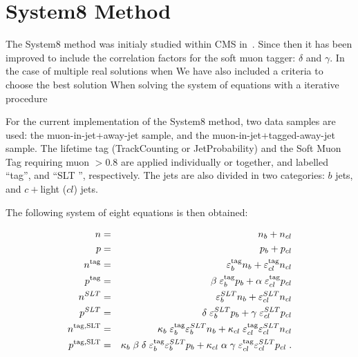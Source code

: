 \section{System8 Method}
\label{sec:system8}

The System8 method was initialy studied within CMS in~\cite{ref:btag_oldnote}. Since then it has been 
improved to include the correlation factors for the soft muon tagger:
 $\delta $ and $\gamma$. In the case of multiple real solutions when 
We have also included a criteria to choose the best solution 
When solving the system of equations with a iterative procedure
 
For the current implementation of the System8 method, 
two data samples are used: the muon-in-jet+away-jet sample, and the 
muon-in-jet+tagged-away-jet sample. The lifetime tag (TrackCounting or 
JetProbability) and the Soft Muon Tag requiring muon  \ptrel $ > 0.8 $\gevc 
are applied individually or together, and labelled ``tag'', and ``SLT '',
 respectively. The jets are also divided in two categories: 
$b$ jets, and $c+$light ($cl$) jets. 

The following system of eight equations is then obtained:

\begin{eqnarray}
n &=& n_b + n_{cl} \nonumber\\
p &=& p_b+ p_{cl}\nonumber\\
n^{\rm{tag}} &=&
\varepsilon_b^{\rm{tag}} n_b + \varepsilon_{cl}^{\rm{tag}} n_{cl} \nonumber\\
p^{\rm{tag}} &=&
\beta \; \varepsilon_b^{\rm{tag}} p_b + \alpha \; \varepsilon_{cl}^{\rm{tag}} p_{cl} \nonumber\\
n^{SLT} &=&
\varepsilon_b^{SLT} n_b + \varepsilon_{cl}^{SLT} n_{cl} \nonumber \\
p^{SLT} &=& \delta \; \varepsilon_b^{SLT} p_b + \gamma \; \varepsilon_{cl}^{SLT} p_{cl} \nonumber\\
n^{\rm{tag},SLT} &=&
\kappa_b \; \varepsilon_b^{\rm{tag}} \varepsilon_b^{SLT} n_b +
\kappa_{cl} \; \varepsilon_{cl}^{\rm{tag}} \varepsilon_{cl}^{SLT} n_{cl} \nonumber\\
p^{\rm{tag},SLT} &=&
\kappa_b \; \beta \; \delta \; \varepsilon_b^{\rm{tag}} \varepsilon_b^{SLT} p_b +
\kappa_{cl} \; \alpha \; \gamma \; \varepsilon_{cl}^{\rm{tag}} \varepsilon_{cl}^{SLT} p_{cl} \;.\nonumber
\end{eqnarray}

